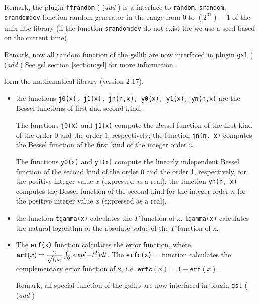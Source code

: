 \documentclass[a4paper,twoside,12pt]{book}
\begin{document}
\begin{description}
Remark, the plugin \texttt{ffrandom} ( ({\it add }) is a interface to   \texttt{random}, \texttt{srandom}, \texttt{srandomdev} fonction random generator
in the range from $0$ to $(2^{31})-1$ of the unix libc library 
  (if the function \texttt{srandomdev} do not exist the we use a seed based on the current time).
 
Remark,  now all random function of the gsllib are now interfaced in plugin \texttt{gsl} ( ({\it add })
See gsl section \ref{section:gsl} for more information. 


  form the mathematical library (version 2.17).
\begin{itemize}
\item the functions \texttt{j0(x), j1(x), jn(n,x), y0(x), y1(x), yn(n,x)} are the Bessel functions of first and second kind.

    The functions \texttt{j0(x)} and \texttt{j1(x)} compute the Bessel function of the first
     kind of the order $0$ and the order $1$, respectively; the function \texttt{jn(n, x)}
     computes the Bessel function of the first kind of the integer order $n$.

     The functions \texttt{y0(x)} and \texttt{y1(x)} compute the linearly independent Bessel
     function of the second kind of the order 0 and the order 1, respectively,
     for the positive integer value $x$ (expressed as a real); the function
     \texttt{yn(n, x)} computes the Bessel function of the second kind for the integer
     order $n$ for the positive integer value $x$ (expressed as a real).

\item   the function  \texttt{tgamma(x)} calculates the $\Gamma$ function of x.  \texttt{lgamma(x)} calculates the
     natural logorithm of the absolute value of the $\Gamma$ function of x.
\item       The \texttt{erf(x)} function calculates the error function,  where
      $     \mathtt{erf}(x) = {2\over \sqrt(pi)}\int_0^x   exp(-t^2) dt$.
     The \texttt{erfc(x)} = function calculates the complementary error function of x, i.e.
     $ \mathtt{erfc}(x)= 1- \mathtt{erf}(x) $.


Remark, all special function of the gsllib are now interfaced in plugin \texttt{gsl} ( ({\it add })


\end{itemize}
\end{description}
\end{document}
